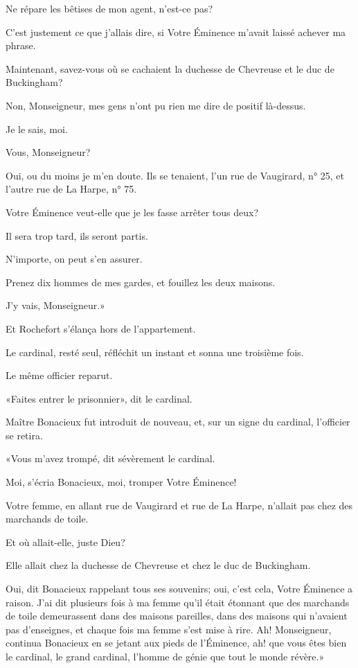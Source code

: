 \speak  Ne répare les bêtises de mon agent, n'est-ce pas? 

\speak  C'est justement ce que j'allais dire, si Votre Éminence m'avait laissé achever ma phrase. 

\speak  Maintenant, savez-vous où se cachaient la duchesse de Chevreuse et le duc de Buckingham? 

\speak  Non, Monseigneur, mes gens n'ont pu rien me dire de positif là-dessus. 

\speak  Je le sais, moi. 

\speak  Vous, Monseigneur? 

\speak  Oui, ou du moins je m'en doute. Ils se tenaient, l'un rue de Vaugirard, n° 25, et l'autre rue de La Harpe, n° 75. 

\speak  Votre Éminence veut-elle que je les fasse arrêter tous deux? 

\speak  Il sera trop tard, ils seront partis. 

\speak  N'importe, on peut s'en assurer. 

\speak  Prenez dix hommes de mes gardes, et fouillez les deux maisons. 

\speak  J'y vais, Monseigneur.» 

Et Rochefort s'élança hors de l'appartement. 

Le cardinal, resté seul, réfléchit un instant et sonna une troisième fois. 

Le même officier reparut. 

«Faites entrer le prisonnier», dit le cardinal. 

Maître Bonacieux fut introduit de nouveau, et, sur un signe du cardinal, l'officier se retira. 

«Vous m'avez trompé, dit sévèrement le cardinal. 

\speak  Moi, s'écria Bonacieux, moi, tromper Votre Éminence! 

\speak  Votre femme, en allant rue de Vaugirard et rue de La Harpe, n'allait pas chez des marchands de toile. 

\speak  Et où allait-elle, juste Dieu? 

\speak  Elle allait chez la duchesse de Chevreuse et chez le duc de Buckingham. 

\speak  Oui, dit Bonacieux rappelant tous ses souvenirs; oui, c'est cela, Votre Éminence a raison. J'ai dit plusieurs fois à ma femme qu'il était étonnant que des marchands de toile demeurassent dans des maisons pareilles, dans des maisons qui n'avaient pas d'enseignes, et chaque fois ma femme s'est mise à rire. Ah! Monseigneur, continua Bonacieux en se jetant aux pieds de l'Éminence, ah! que vous êtes bien le cardinal, le grand cardinal, l'homme de génie que tout le monde révère.» 

